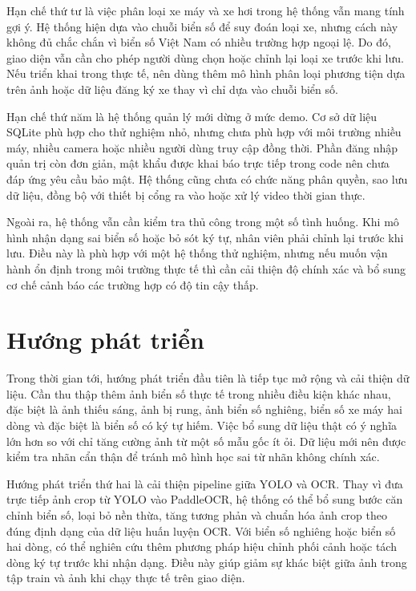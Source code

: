 \documentclass[13pt,a4paper]{report}
\begin{document}
Hạn chế thứ tư là việc phân loại xe máy và xe hơi trong hệ thống vẫn mang tính gợi ý. Hệ thống hiện dựa vào chuỗi biển số để suy đoán loại xe, nhưng cách này không đủ chắc chắn vì biển số Việt Nam có nhiều trường hợp ngoại lệ. Do đó, giao diện vẫn cần cho phép người dùng chọn hoặc chỉnh lại loại xe trước khi lưu. Nếu triển khai trong thực tế, nên dùng thêm mô hình phân loại phương tiện dựa trên ảnh hoặc dữ liệu đăng ký xe thay vì chỉ dựa vào chuỗi biển số.

Hạn chế thứ năm là hệ thống quản lý mới dừng ở mức demo. Cơ sở dữ liệu SQLite phù hợp cho thử nghiệm nhỏ, nhưng chưa phù hợp với môi trường nhiều máy, nhiều camera hoặc nhiều người dùng truy cập đồng thời. Phần đăng nhập quản trị còn đơn giản, mật khẩu được khai báo trực tiếp trong code nên chưa đáp ứng yêu cầu bảo mật. Hệ thống cũng chưa có chức năng phân quyền, sao lưu dữ liệu, đồng bộ với thiết bị cổng ra vào hoặc xử lý video thời gian thực.

Ngoài ra, hệ thống vẫn cần kiểm tra thủ công trong một số tình huống. Khi mô hình nhận dạng sai biển số hoặc bỏ sót ký tự, nhân viên phải chỉnh lại trước khi lưu. Điều này là phù hợp với một hệ thống thử nghiệm, nhưng nếu muốn vận hành ổn định trong môi trường thực tế thì cần cải thiện độ chính xác và bổ sung cơ chế cảnh báo các trường hợp có độ tin cậy thấp.

\section{Hướng phát triển}

Trong thời gian tới, hướng phát triển đầu tiên là tiếp tục mở rộng và cải thiện dữ liệu. Cần thu thập thêm ảnh biển số thực tế trong nhiều điều kiện khác nhau, đặc biệt là ảnh thiếu sáng, ảnh bị rung, ảnh biển số nghiêng, biển số xe máy hai dòng và đặc biệt là biển số có ký tự hiếm. Việc bổ sung dữ liệu thật có ý nghĩa lớn hơn so với chỉ tăng cường ảnh từ một số mẫu gốc ít ỏi. Dữ liệu mới nên được kiểm tra nhãn cẩn thận để tránh mô hình học sai từ nhãn không chính xác.

Hướng phát triển thứ hai là cải thiện pipeline giữa YOLO và OCR. Thay vì đưa trực tiếp ảnh crop từ YOLO vào PaddleOCR, hệ thống có thể bổ sung bước căn chỉnh biển số, loại bỏ nền thừa, tăng tương phản và chuẩn hóa ảnh crop theo đúng định dạng của dữ liệu huấn luyện OCR. Với biển số nghiêng hoặc biển số hai dòng, có thể nghiên cứu thêm phương pháp hiệu chỉnh phối cảnh hoặc tách dòng ký tự trước khi nhận dạng. Điều này giúp giảm sự khác biệt giữa ảnh trong tập train và ảnh khi chạy thực tế trên giao diện.
\end{document}
